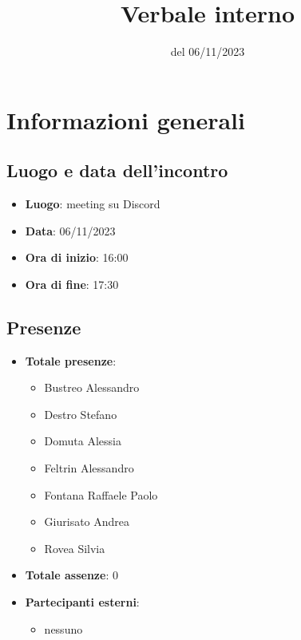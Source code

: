 \documentclass[12pt]{article}
\title{Verbale interno}
\date{del 06/11/2023}
\begin{document}
	\makefirstpage
	
	
	\clearpage
	
	\tableofcontents
	\clearpage

    \section{Informazioni generali}
	
	\subsection{Luogo e data dell'incontro}
	
    	\begin{itemize}
    		\item \textbf{Luogo}: meeting su Discord
    		\item \textbf{Data}: 06/11/2023
    		\item \textbf{Ora di inizio}: 16:00
    		\item \textbf{Ora di fine}: 17:30
    	\end{itemize}
	
	\subsection{Presenze}
	
    	\begin{itemize}
    		\item \textbf{Totale presenze}:
    		\begin{itemize}
    			\item Bustreo Alessandro
    			\item Destro Stefano
    			\item Domuta Alessia 
    			\item Feltrin Alessandro 
    			\item Fontana Raffaele Paolo 
    			\item Giurisato Andrea 
    			\item Rovea Silvia
    		\end{itemize}
    		
    		\item \textbf{Totale assenze}: 0
    		
    		\item \textbf{Partecipanti esterni}:
    		\begin{itemize}
    			\item nessuno
    		\end{itemize}
    	\end{itemize}
\end{document}
